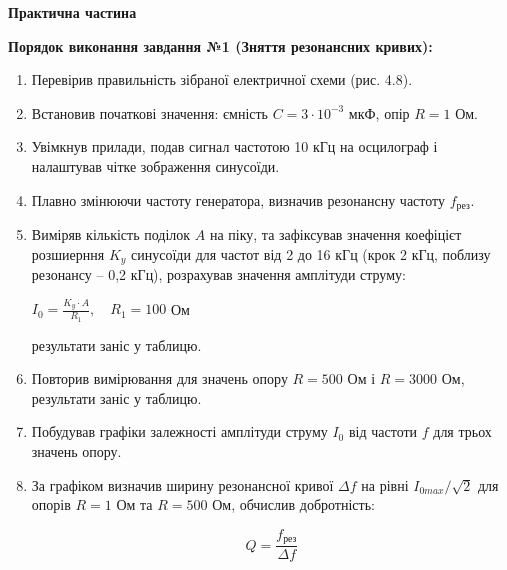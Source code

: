 \documentclass[12pt,a4paper]{article}
\begin{document}
    \newpage


    \setlength{\parindent}{0pt}

    \begin{center}
        \textbf{\Large Практична частина}
    \end{center}

    \textbf{Порядок виконання завдання №1 (Зняття резонансних кривих):}

    \begin{enumerate}
        \item Перевірив правильність зібраної електричної схеми (рис. 4.8).
    
        \item Встановив початкові значення: ємність $C = 3\cdot10^{-3}$ мкФ, опір $R = 1$ Ом.
    
        \item Увімкнув прилади, подав сигнал частотою 10 кГц на осцилограф і налаштував чітке зображення синусоїди.
    
        \item Плавно змінюючи частоту генератора, визначив резонансну частоту $f_{\text{рез}}$.
    
        \item Виміряв кількість поділок $A$ на піку, та зафіксував значення коефіцієт розшиерння $K_y$ синусоїди для частот від 2 до 16 кГц (крок 2 кГц, поблизу резонансу – 0,2 кГц), розрахував значення амплітуди струму:

        \vspace{-0.5em}

        \begin{center}
            $\displaystyle I_0 = \frac{K_y \cdot A}{R_1}, \quad R_1 = 100$ Ом
        \end{center}

        \vspace{-0.5em}

        результати заніс у таблицю.
    
        \item Повторив вимірювання для значень опору $R = 500$ Ом і $R = 3000$ Ом, результати заніс у таблицю.
    
        \item Побудував графіки залежності амплітуди струму $I_0$ від частоти $f$ для трьох значень опору.
    
        \item За графіком визначив ширину резонансної кривої $\Delta f$ на рівні $I_{0 max}/\sqrt{2}$ для опорів $R = 1$ Ом та $R = 500$ Ом, обчислив добротність:
        
        \begin{equation}
            Q = \frac{f_{\text{рез}}}{\Delta f}
            \tag{4.п1}
        \end{equation}

    \end{enumerate}
\end{document}
